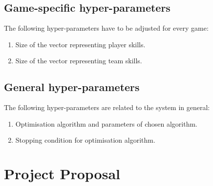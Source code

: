 \documentclass[12pt,a4paper]{book}
\begin{document}
\section{Game-specific hyper-parameters}
The following hyper-parameters have to be adjusted for every game:
\begin{enumerate}
\item Size of the vector representing player skills.
\item Size of the vector representing team skills.
\end{enumerate}
\section{General hyper-parameters}
The following hyper-parameters are related to the system in general:
\begin{enumerate}
\item Optimisation algorithm and parameters of chosen algorithm.
\item Stopping condition for optimisation algorithm.
\end{enumerate}

\chapter{Project Proposal}
\label{proposal}
\end{document}
